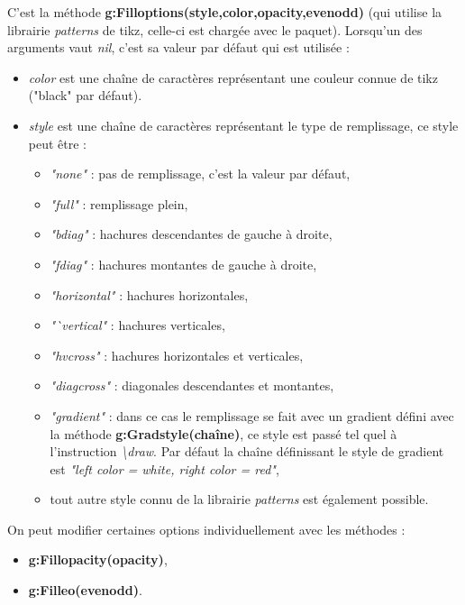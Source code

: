 C'est la méthode \textbf{g:Filloptions(style,color,opacity,evenodd)} (qui utilise la librairie \emph{patterns} de tikz, celle-ci est chargée avec le paquet). Lorsqu'un des arguments vaut \emph{nil}, c'est sa valeur par défaut qui est utilisée :

\begin{itemize}
  \item \emph{color} est une chaîne de caractères représentant une couleur connue de tikz ("black" par défaut).
  \item \emph{style} est une chaîne de caractères représentant le type de remplissage, ce style peut être :
      \begin{itemize}
      \item \emph{"none"} : pas de remplissage, c'est la valeur par défaut,
      \item \emph{"full"} : remplissage plein,
      \item \emph{"bdiag"} : hachures descendantes de gauche à droite,
      \item \emph{"fdiag"} : hachures montantes de gauche à droite,
      \item \emph{"horizontal"} : hachures horizontales,
      \item \emph{"`vertical"} : hachures verticales,
      \item \emph{"hvcross"} : hachures horizontales et verticales,
      \item \emph{"diagcross"} : diagonales descendantes et montantes,
      \item \emph{"gradient"} : dans ce cas le remplissage se fait avec un gradient défini avec la méthode \textbf{g:Gradstyle(chaîne)}, ce style est passé tel quel à l'instruction \emph{\textbackslash draw}. Par défaut la chaîne définissant le style de gradient est \emph{"left color = white, right color = red"},
      \item tout autre style connu de la librairie \emph{patterns} est également possible.
      \end{itemize}
\end{itemize}

On peut modifier certaines options individuellement avec les méthodes :
\begin{itemize}
    \item \textbf{g:Fillopacity(opacity)}, 
    \item \textbf{g:Filleo(evenodd)}.
\end{itemize}

